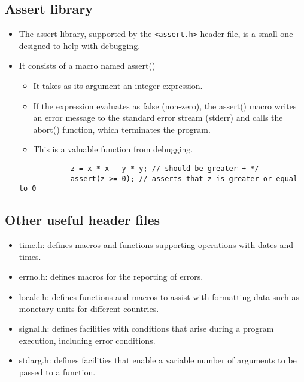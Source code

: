 \subsection{Assert library}
\begin{itemize}
    \item The assert library, supported by the \verb|<assert.h>| header file, is a small one designed to help with debugging.
    \item It consists of a macro named assert()
        \begin{itemize}
            \item It takes as its argument an integer expression. 
            \item If the expression evaluates as false (non-zero), the assert() macro writes an error message to the standard error stream (stderr) and calls the abort() function, which terminates the program.
            \item This is a valuable function from debugging.
        \end{itemize}
        \begin{verbatim}
            z = x * x - y * y; // should be greater + */
            assert(z >= 0); // asserts that z is greater or equal to 0
        \end{verbatim}
\end{itemize}

\subsection{Other useful header files}
\begin{itemize}
    \item time.h: defines macros and functions supporting operations with dates and times. 
    \item errno.h: defines macros for the reporting of errors. 
    \item locale.h: defines functions and macros to assist with formatting data such as monetary units for different countries.
    \item signal.h: defines facilities with conditions that arise during a program execution, including error conditions.
    \item stdarg.h: defines facilities that enable a variable number of arguments to be passed to a function. 
\end{itemize}
